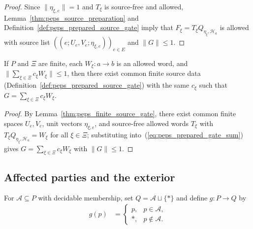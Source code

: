 \begin{proof}
    \leanok
    Since $\|\eta_{\xi,e}\|=1$ and $T_\xi$ is source-free and allowed,
    Lemma~\ref{thm:peps_source_preparation} and
    Definition~\ref{def:peps_prepared_source_gate} imply that $F_\xi=T_\xi Q_{\eta_\xi,\mathcal H_a}$
    is allowed with source list $((e;U_e,V_e;\eta_{\xi,e}))_{e\in E}$ and $\|G\|\le 1$.
\end{proof}

\begin{lemma}
    \label{thm:peps_prepared_gate_exists}
    \leanok
    If $P$ and $\Xi$ are finite, each $W_\xi:a\to b$ is an allowed word, and
    $\|\sum_{\xi\in\Xi}c_\xi W_\xi\|\leq1$, then there exist common finite
    source data (Definition~\ref{def:peps_prepared_source_gate}) with the same
    $c_\xi$ such that $G=\sum_{\xi\in\Xi}c_\xi W_\xi$.
\end{lemma}

\begin{proof}
    \leanok
    By Lemma~\ref{thm:peps_finite_source_gate}, there exist common finite
    spaces $U_e,V_e$, unit vectors $\eta_{\xi,e}$, and source-free allowed words
    $T_\xi$ with $T_\xi Q_{\eta_\xi,\mathcal H_a}=W_\xi$ for all $\xi\in\Xi$;
    substituting into~(\ref{eq:peps_prepared_gate_sum}) gives
    $G=\sum_{\xi\in\Xi}c_\xi W_\xi$ with $\|G\|\le 1$.
\end{proof}

\subsection{Affected parties and the exterior}

\begin{definition}
    \label{def:peps_affected_owner}
    \leanok
    For $\mathcal A\subseteq P$ with decidable membership, set
    $Q=\mathcal A\sqcup\{*\}$ and define $g:P\to Q$ by
    \begin{align}
        g(p) & =
        \begin{cases}
            p,   & p\in\mathcal A,    \\
            {*}, & p\notin\mathcal A.
        \end{cases}
        \label{eq:peps_affected_owner}
    \end{align}
\end{definition}

